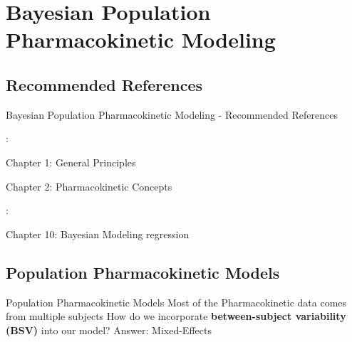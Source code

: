 \section{Bayesian Population Pharmacokinetic Modeling}

\subsection{Recommended References}
\begin{frame}{Bayesian Population Pharmacokinetic Modeling - Recommended References}
    \begin{vfilleditems}
        \item \textcite{Gabrielsson2006PKPDbook}:
        \begin{vfilleditems}
            \item Chapter 1: General Principles
            \item Chapter 2: Pharmacokinetic Concepts
        \end{vfilleditems}
        \item \textcite{Bonate2011PKPDbook}:
        \begin{vfilleditems}
            \item Chapter 10: Bayesian Modeling regression
        \end{vfilleditems}
        \item \textcite{margossian2022torsten}
    \end{vfilleditems}
\end{frame}

\subsection{Population Pharmacokinetic Models}
\begin{frame}{Population Pharmacokinetic Models}
    Most of the Pharmacokinetic data comes from multiple subjects
    \vfill
    How do we incorporate \textbf{between-subject variability (BSV)} into our model?
    \vfill
    Answer: Mixed-Effects
\end{frame}